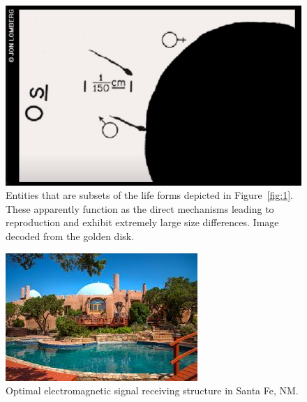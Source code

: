 \begin{figure}
\centering
\includegraphics[width=0.5\columnwidth]{spermandegg_voyager.jpg}
\caption{Entities that are subsets of the life forms depicted in Figure~\ref{fig:1}. These apparently function as the direct mechanisms leading to reproduction and exhibit extremely large size differences. Image decoded from the golden disk.
\label{fig:2}}
\end{figure}

\begin{figure}
\centering
\includegraphics[width=0.5\columnwidth]{rassMandal.jpg}
\caption{Optimal electromagnetic signal receiving structure in Santa Fe, NM.
\label{fig:3}}
\end{figure}





